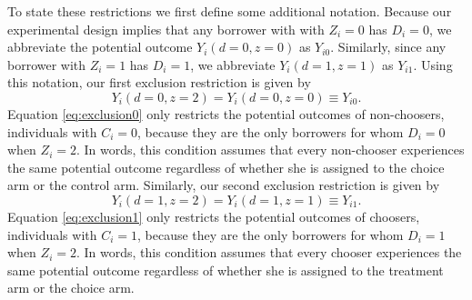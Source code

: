 \documentclass[12pt, a4paper]{article}
\begin{document}
To state these restrictions we first define some additional notation.
Because our experimental design implies that any borrower with with $Z_i = 0$ has $D_i = 0$, we abbreviate the potential outcome $Y_i(d=0,z=0)$ as $Y_{i0}$. 
Similarly, since any borrower with $Z_i = 1$ has $D_i = 1$, we abbreviate $Y_i(d=1,z=1)$ as $Y_{i1}$. 
Using this notation, our first exclusion restriction is given by
\begin{equation}
Y_i(d=0,z=2) = Y_i(d=0,z=0) \equiv Y_{i0}.
\label{eq:exclusion0}
\end{equation}
Equation \ref{eq:exclusion0} only restricts the potential outcomes of non-choosers,  individuals with $C_i = 0$, because they are the only borrowers for whom $D_i = 0$ when $Z_i = 2$.
In words, this condition assumes that every non-chooser experiences the same potential outcome regardless of whether she is assigned to the choice arm or the control arm.
Similarly, our second exclusion restriction is given by
\begin{equation}
Y_i(d=1,z=2) = Y_i(d=1,z=1)\equiv Y_{i1}.
\label{eq:exclusion1}
\end{equation}
Equation \ref{eq:exclusion1} only restricts the potential outcomes of choosers, individuals with $C_i =1$, because they are the only borrowers for whom $D_i = 1$ when $Z_i = 2$.
In words, this condition assumes that every chooser experiences the same potential outcome regardless of whether she is assigned to the treatment arm or the choice arm.
\end{document}
